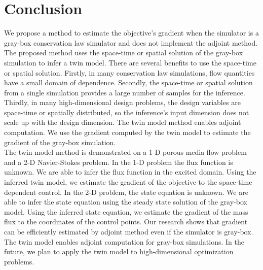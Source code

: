 \documentclass[a4paper,onecolumn]{article}
\theoremstyle{remark}
\begin{document}
\section{Conclusion}
We propose a method to estimate the objective's gradient when the simulator is a gray-box conservation
law simulator and does not
implement the adjoint method. 
The proposed method uses the space-time or spatial solution of the gray-box simulation to
infer a twin model. 
There are several benefits to use the space-time or spatial solution. Firstly, in many conservation law
simulations, flow quantities have a small domain of dependence. Secondly, the space-time or spatial
solution from a single simulation provides a large number of samples for the inference. 
Thirdly, in many high-dimensional design problems, the design variables are space-time or spatially distributed, 
so the inference's input dimension does not scale up with the design dimension.
The twin model method enables adjoint computation. We use the gradient computed 
by the twin model to estimate the gradient of the gray-box simulation.\\

The twin model method is demonstrated on a 1-D porous media flow problem and a
2-D Navier-Stokes problem. In the 1-D problem  
the flux function is unknown. We are able to infer the flux function in the excited domain. 
Using the inferred twin model, we estimate the gradient of the objective to the 
space-time dependent control.
In the 2-D problem, the state equation is unknown. We are able to infer
the state equation using the steady state solution of the gray-box model.
Using the inferred state equation, we estimate the gradient of the mass flux
to the coordinates of the control points.
Our research shows that gradient can be efficiently estimated by adjoint method even if 
the simulator is gray-box.\\

The twin model enables adjoint computation for gray-box simulations. 
In the future, we plan to apply the twin model to high-dimensional optimization problems.
\end{document}
